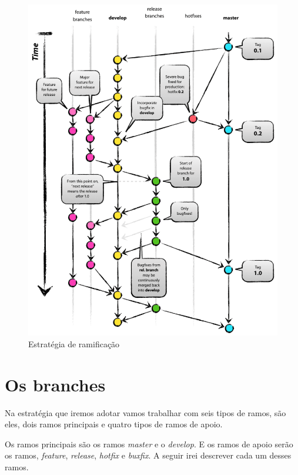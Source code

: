 \documentclass[12pt,openright,oneside,a4paper,english,brazil]{abntex2}
\begin{document}
 \begin{figure}[h]
 	\caption{\label{estrategia}Estratégia de ramificação}
 	\begin{center}
 		\includegraphics[width=0.85\linewidth]{estrategia}
 	\end{center}
 \end{figure}


\section{Os branches}

Na estratégia que iremos adotar vamos trabalhar com seis tipos de ramos, são eles, dois ramos principais e quatro tipos de ramos de apoio. 

Os ramos principais são os ramos \textit{master} e o \textit{develop}. E os ramos de apoio serão os ramos, \textit{feature}, \textit{release}, \textit{hotfix} e \textit{buxfix}. A seguir irei descrever cada um desses ramos. 

\end{document}
